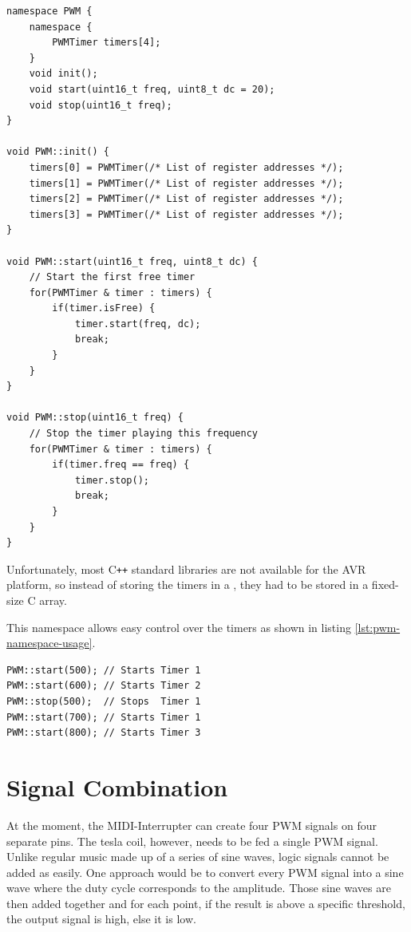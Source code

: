 \begin{lstlisting}[caption=PWM namespace, label=lst:pwm-namespace]
namespace PWM {
	namespace {
		PWMTimer timers[4];
	}
	void init();
	void start(uint16_t freq, uint8_t dc = 20);
	void stop(uint16_t freq);
}

void PWM::init() {
    timers[0] = PWMTimer(/* List of register addresses */);
	timers[1] = PWMTimer(/* List of register addresses */);
	timers[2] = PWMTimer(/* List of register addresses */);
	timers[3] = PWMTimer(/* List of register addresses */);
}

void PWM::start(uint16_t freq, uint8_t dc) {
    // Start the first free timer
    for(PWMTimer & timer : timers) {
        if(timer.isFree) {
            timer.start(freq, dc);
            break;
        }
    }
}

void PWM::stop(uint16_t freq) {
    // Stop the timer playing this frequency
    for(PWMTimer & timer : timers) {
        if(timer.freq == freq) {
            timer.stop();
            break;
        }
    }
}
\end{lstlisting}

Unfortunately, most C\texttt{++} standard libraries are not available for the AVR platform, so instead of storing the timers in a , they had to be stored in a fixed-size C array.

This namespace allows easy control over the timers as shown in listing \ref{lst:pwm-namespace-usage}.

\begin{lstlisting}[caption=PWM namespace usage, label=lst:pwm-namespace-usage]
PWM::start(500); // Starts Timer 1
PWM::start(600); // Starts Timer 2
PWM::stop(500);  // Stops  Timer 1
PWM::start(700); // Starts Timer 1
PWM::start(800); // Starts Timer 3
\end{lstlisting}

\section{Signal Combination}
\label{sec:signal-combination}


At the moment, the MIDI-Interrupter can create four PWM signals on four separate pins. The tesla coil, however, needs to be fed a single PWM signal. Unlike regular music made up of a series of sine waves, logic signals cannot be added as easily. One approach would be to convert every PWM signal into a sine wave where the duty cycle corresponds to the amplitude. Those sine waves are then added together and for each point, if the result is above a specific threshold, the output signal is high, else it is low.


